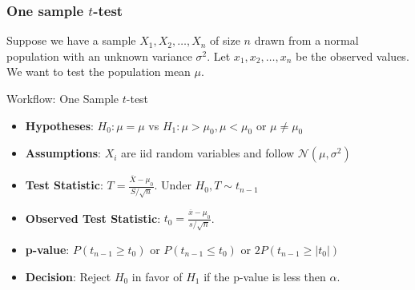 \documentclass[a4paper]{article}
\begin{document}
\subsubsection{One sample \( t \)-test}
Suppose we have a sample \( X_1,X_2,\dotsc,X_n \) of size \( n \) drawn from a normal population with an unknown variance \( \sigma^2 \). Let \( x_1,x_2,\dotsc,x_n \) be the \textcolor{myred}{observed values}. We want to test the population mean \( \mu \).  
\begin{redbox}{Workflow: One Sample \( t \)-test}
	\begin{itemize}
		\item \textbf{Hypotheses}: \( H_0: \mu = \mu \) vs \( H_1: \mu > \mu_0, \mu < \mu_0 \) or \( \mu \neq \mu_0 \)
		\item \textbf{Assumptions}: \( X_i \) are iid random variables and follow \( \mathcal{N} (\mu,\sigma^2) \) 
		\item \textbf{Test Statistic}: \( T = \frac{\overline{X} - \mu_0}{S / \sqrt{n}} \). Under \( H_0, T \sim t_{n-1} \)   
		\item \textbf{Observed Test Statistic}: \( t_0 = \frac{\overline{x} - \mu_0}{s / \sqrt{n}} \).
		\item \textbf{p-value}: \( P(t_{n-1} \geq t_0) \) or \( P(t_{n-1} \leq t_0) \) or \( 2P(t_{n-1} \geq \lvert t_0 \rvert) \)
		\item \textbf{Decision}: Reject \( H_0 \) in favor of \( H_1 \) if the p-value is less then \( \alpha \).
	\end{itemize}
\end{redbox}
\end{document}
